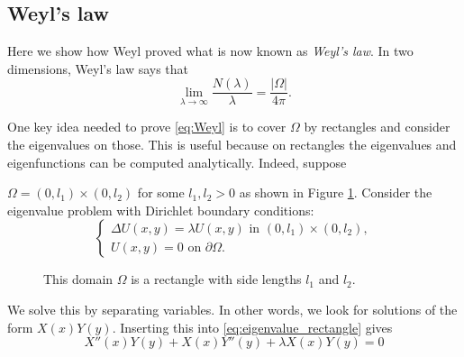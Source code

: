 \documentclass{amsart}
\theoremstyle{definition}
\begin{document}
\subsection{Weyl's law} \label{sec:Weyl_approx}
Here we show how Weyl proved what is now known as \textit{Weyl's law}. In two dimensions, Weyl's law says that
\begin{equation} \label{eq:Weyl}
    \lim_{\lambda \to \infty} \frac{N(\lambda)}{\lambda} = \frac{|\Omega|}{4\pi}.
\end{equation}

One key idea needed to prove \eqref{eq:Weyl} is to cover $\Omega$ by rectangles and consider the eigenvalues on those. This is useful because on rectangles the eigenvalues and eigenfunctions can be computed analytically. Indeed, suppose

$\Omega = (0, l_1) \times (0, l_2)$ for some $l_1, l_2 > 0$ as shown in Figure \ref{fig:rectangle_domain}. Consider the eigenvalue problem with Dirichlet boundary conditions: 
\begin{equation} \label{eq:eigenvalue_rectangle}
        \begin{cases}
            \Delta U(x,y) = \lambda U(x,y) \text{ in } (0, l_1) \times (0, l_2), \\
            U(x,y) = 0 \text{ on } \partial\Omega.
        \end{cases}
\end{equation}
\begin{figure} 
    \centering
    \caption{This domain $\Omega$ is a rectangle with side lengths $l_1$ and $l_2$.}
    \label{fig:rectangle_domain}
\end{figure}
We solve this by separating variables. In other words, we look for solutions of the form $X(x)Y(y)$. Inserting this into \eqref{eq:eigenvalue_rectangle} gives
\begin{equation*} 
        X''(x)Y(y) + X(x)Y''(y) + \lambda X(x)Y(y) = 0
\end{equation*}
\end{document}
